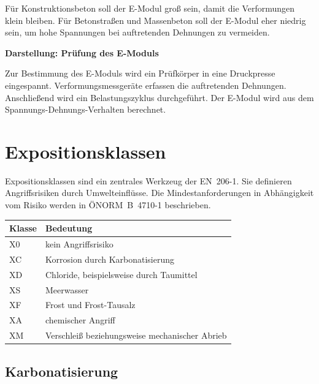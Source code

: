 \documentclass[
  12pt,
  a4paper,
  oneside
]{scrreprt}
\begin{document}
Für Konstruktionsbeton soll der E-Modul groß sein, damit die
Verformungen klein bleiben. Für Betonstraßen und Massenbeton soll der
E-Modul eher niedrig sein, um hohe Spannungen bei auftretenden
Dehnungen zu vermeiden.


\begin{darstellungsbox}
\textbf{Darstellung: Prüfung des E-Moduls}

Zur Bestimmung des E-Moduls wird ein Prüfkörper in eine Druckpresse
eingespannt. Verformungsmessgeräte erfassen die auftretenden Dehnungen.
Anschließend wird ein Belastungszyklus durchgeführt. Der E-Modul wird
aus dem Spannungs-Dehnungs-Verhalten berechnet.
\end{darstellungsbox}

\section{Expositionsklassen}

Expositionsklassen sind ein zentrales Werkzeug der EN~206-1. Sie
definieren Angriffsrisiken durch Umwelteinflüsse. Die
Mindestanforderungen in Abhängigkeit vom Risiko werden in
ÖNORM~B~4710-1 beschrieben.


\begin{longtable}{
  >{\centering\arraybackslash}p{}
  >{\raggedright\arraybackslash}p{}
}
\toprule
\textbf{Klasse} & \textbf{Bedeutung} \\
\midrule
\endhead

X0 & kein Angriffsrisiko \\

XC & Korrosion durch Karbonatisierung \\

XD & Chloride, beispielsweise durch Taumittel \\

XS & Meerwasser \\

XF & Frost und Frost-Tausalz \\

XA & chemischer Angriff \\

XM & Verschleiß beziehungsweise mechanischer Abrieb \\

\bottomrule
\end{longtable}



\subsection{Karbonatisierung}
\end{document}
